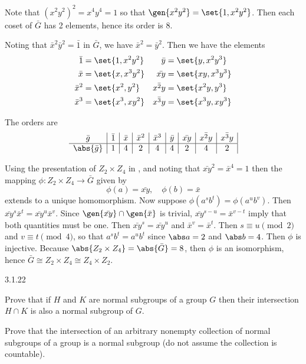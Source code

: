 \begin{solenum}
    \item Note that $(x^2y^2)^2 = x^4y^4 = 1$ so that $\gen{x^2y^2} = \set{1, x^2y^2}$.
	Then each coset of $\bar G$ has 2 elements, hence its order is 8.
    \item Noting that $\bar x^2 \bar y^2 = \bar 1$ in $\bar G$, we have $\bar x^2 = \bar y^2$.
	Then we have the elements
    \begin{align*}
        \bar 1 & = \set{1, x^2y^2} & \bar y & = \set{y, x^2y^3} \\
        \bar x & = \set{x, x^3y^2} & \bar{xy} & = \set{xy, x^3y^3} \\
        \bar x^2 & = \set{x^2, y^2} & \bar{x^2y} & = \set{x^2y, y^3} \\
        \bar x^3 & = \set{x^3, xy^2} & \bar{x^3y} & = \set{x^3y, xy^3}
    \end{align*}
    \item The orders are
    \[
        \begin{array}{*{9}{c|}}
            \bar g & \bar 1 & \bar x & \bar x^2 & \bar x^3 & \bar y & \bar{xy} & \bar{x^2y} & \bar{x^3y} \\
            \hline
            \abs{\bar g} & 1 & 4 & 2 & 4 & 4 & 2 & 4 & 2
        \end{array}
    \]
    \item Using the presentation of $Z_2 \times Z_4$ in , and noting that $\bar{xy}^2 = \bar x^4 = 1$ then the mapping $\phi \colon Z_2 \times Z_4 \to \bar G$ given by
    \[
    	\phi(a) = \bar{xy}, \quad \phi(b) = \bar x
    \]
    extends to a unique homomorphism.
	Now suppose $\phi(a^sb^t) = \phi(a^ub^v)$.
	Then $\bar{xy}^s\bar x^t = \bar{xy}^u\bar x^v$.
	Since $\gen{\bar{xy}} \cap \gen{\bar x}$ is trivial, $\bar{xy}^{s - u} = \bar x^{v - t}$ imply that both quantities must be one.
	Then $\bar{xy}^s = \bar{xy}^u$ and $\bar x^v = \bar x^t$.
	Then $s \equiv u \pmod 2$ and $v \equiv t \pmod 4$, so that $a^sb^t = a^ub^t$ since $\abs a = 2$ and $\abs b = 4$.
	Then $\phi$ is injective.
	Because $\abs{Z_2 \times Z_4} = \abs{\bar G} = 8$, then $\phi$ is an isomorphism, hence $\bar G \cong Z_2 \times Z_4 \cong Z_4 \times Z_2$.
\end{solenum}

\begin{exercise}{3.1.22}
    \begin{subexercises}
        \item Prove that if $H$ and $K$ are normal subgroups of a group $G$ then their intersection $H \cap K$ is also a normal subgroup of $G$.
        \item Prove that the intersection of an arbitrary nonempty collection of normal subgroups of a group is a normal subgroup (do not assume the collection is countable).
    \end{subexercises}
\end{exercise}

